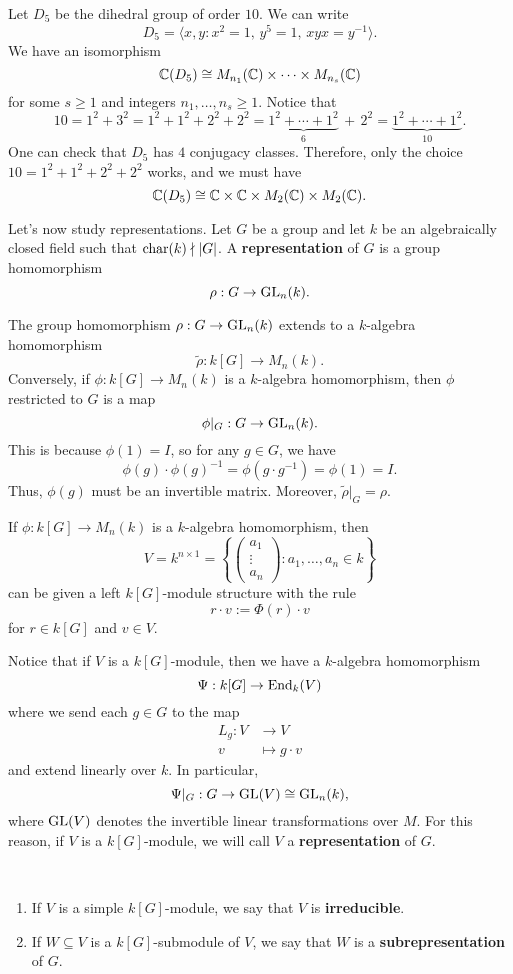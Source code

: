 \begin{exmp}
    Let $D_5$ be the dihedral group of order $10$. We can write 
    \[ D_5 = \langle x, y : x^2 = 1,\, y^5 = 1,\, xyx = y^{-1} \rangle. \] 
    We have an isomorphism 
    \[ \mathbb{C}(D_5) \cong M_{n_1}(\mathbb{C}) \times \cdots \times M_{n_s}(\mathbb{C}) \] 
    for some $s \geq 1$ and integers $n_1, \dots, n_s \geq 1$. 
    Notice that 
    \[ 10 = 1^2 + 3^2 = 1^2 + 1^2 + 2^2 + 2^2 = \underbrace{1^2 + \cdots + 1^2}_{6} \,+\, 2^2 
    = \underbrace{1^2 + \cdots + 1^2}_{10}. \] 
    One can check that $D_5$ has $4$ conjugacy classes. Therefore, only the 
    choice $10 = 1^2 + 1^2 + 2^2 + 2^2$ works, and we must have 
    \[ \mathbb{C}(D_5) \cong \mathbb{C} \times \mathbb{C} \times M_2(\mathbb{C}) \times M_2(\mathbb{C}). \] 
\end{exmp}

Let's now study representations. Let $G$ be a group and 
let $k$ be an algebraically closed field such that $\operatorname{char}(k) \nmid |G|$. 
A {\bf representation} of $G$ is a group homomorphism 
\[ \rho : G \to \operatorname{GL}_n(k). \]

\begin{remark}
    The group homomorphism $\rho : G \to \operatorname{GL}_n(k)$ extends to a $k$-algebra 
    homomorphism 
    \[ \tilde\rho : k[G] \to M_n(k). \] 
    Conversely, if $\phi : k[G] \to M_n(k)$ is a $k$-algebra homomorphism, then
    $\phi$ restricted to $G$ is a map  
    \[ \phi|_G : G \to \operatorname{GL}_n(k). \] 
    This is because $\phi(1) = I$, so for any $g \in G$, we have 
    \[ \phi(g) \cdot \phi(g)^{-1} = \phi(g \cdot g^{-1}) = \phi(1) = I. \] 
    Thus, $\phi(g)$ must be an invertible matrix. Moreover, $\tilde\rho|_G 
    = \rho$. 
\end{remark}

\begin{remark}
    If $\phi : k[G] \to M_n(k)$ is a $k$-algebra homomorphism, then 
    \[ V = k^{n\times 1} = \left\{ \begin{pmatrix} a_1 \\ \vdots \\ a_n
    \end{pmatrix} : a_1, \dots, a_n \in k \right\} \] 
    can be given a left $k[G]$-module structure with the rule 
    \[ r \cdot v := \Phi(r) \cdot v \] 
    for $r \in k[G]$ and $v \in V$. 
\end{remark} 

Notice that if $V$ is a $k[G]$-module, then we have a $k$-algebra homomorphism
\[ \Psi : k[G] \to \operatorname{End}_k(V) \] 
where we send each $g \in G$ to the map 
\begin{align*} L_g : V &\to V \\ v &\mapsto g\cdot v \end{align*}
and extend linearly over $k$. In particular, 
\[ \Psi|_G : G \to \operatorname{GL}(V) \cong \operatorname{GL}_n(k), \] 
where $\operatorname{GL}(V)$ denotes the invertible linear transformations over $M$. 
For this reason, if $V$ is a $k[G]$-module, we will call $V$ a 
{\bf representation} of $G$. 

\begin{defn}~
    \begin{enumerate}[(1)]
        \item If $V$ is a simple $k[G]$-module, we say that $V$ is {\bf irreducible}.
        \item If $W \subseteq V$ is a $k[G]$-submodule of $V$, we say that $W$ is a 
        {\bf subrepresentation} of $G$. 
    \end{enumerate}
\end{defn}